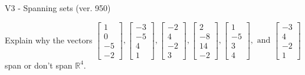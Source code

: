 \begin{exercise}
  \begin{exerciseTitle}V3 - Spanning sets (ver. 950)\end{exerciseTitle}
  \begin{exerciseStatement}
    Explain why the vectors \(\left[\begin{array}{r}
1 \\
0 \\
-5 \\
-2
\end{array}\right] , \left[\begin{array}{r}
-3 \\
-5 \\
4 \\
1
\end{array}\right] , \left[\begin{array}{r}
-2 \\
4 \\
-2 \\
3
\end{array}\right] , \left[\begin{array}{r}
2 \\
-8 \\
14 \\
-2
\end{array}\right] , \left[\begin{array}{r}
1 \\
-5 \\
3 \\
4
\end{array}\right] , \text{ and } \left[\begin{array}{r}
-3 \\
4 \\
-2 \\
1
\end{array}\right]\) span or don't span \(\mathbb{R}^4\). 
	



\end{exerciseStatement}
\end{exercise}
